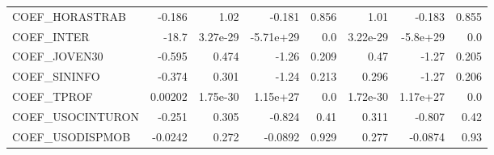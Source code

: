 \begin{tabular}{lrrrrrrr}
COEF\_HORASTRAB   &    -0.186 &     1.02 &    -0.181 &    0.856 &          1.01 &       -0.183 &         0.855 \\
COEF\_INTER       &     -18.7 & 3.27e-29 & -5.71e+29 &      0.0 &      3.22e-29 &     -5.8e+29 &           0.0 \\
COEF\_JOVEN30     &    -0.595 &    0.474 &     -1.26 &    0.209 &          0.47 &        -1.27 &         0.205 \\
COEF\_SININFO     &    -0.374 &    0.301 &     -1.24 &    0.213 &         0.296 &        -1.27 &         0.206 \\
COEF\_TPROF       &   0.00202 & 1.75e-30 &  1.15e+27 &      0.0 &      1.72e-30 &     1.17e+27 &           0.0 \\
COEF\_USOCINTURON &    -0.251 &    0.305 &    -0.824 &     0.41 &         0.311 &       -0.807 &          0.42 \\
COEF\_USODISPMOB  &   -0.0242 &    0.272 &   -0.0892 &    0.929 &         0.277 &      -0.0874 &          0.93 \\
\bottomrule
\end{tabular}

